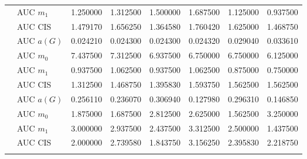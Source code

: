 \begin{table}[htbp]
\begin{tabular}{llrrrrrr}
    & AUC $m_1$ & 1.250000 & 1.312500 & 1.500000 & 1.687500 & 1.125000 & 0.937500 \\
    & AUC CIS & 1.479170 & 1.656250 & 1.364580 & 1.760420 & 1.625000 & 1.468750 \\
    \addlinespace
    \multirow{4}{*}{degree} & AUC $a(G)$ & 0.024210 & 0.024300 & 0.024300 & 0.024320 & 0.029040 & 0.033610 \\
    & AUC $m_0$ & 7.437500 & 7.312500 & 6.937500 & 6.750000 & 6.750000 & 6.125000 \\
    & AUC $m_1$ & 0.937500 & 1.062500 & 0.937500 & 1.062500 & 0.875000 & 0.750000 \\
    & AUC CIS & 1.312500 & 1.468750 & 1.395830 & 1.593750 & 1.562500 & 1.562500 \\
    \addlinespace
    \multirow{4}{*}{random} & AUC $a(G)$ & 0.256110 & 0.236070 & 0.306940 & 0.127980 & 0.296310 & 0.146850 \\
    & AUC $m_0$ & 1.875000 & 1.687500 & 2.812500 & 2.625000 & 1.562500 & 3.250000 \\
    & AUC $m_1$ & 3.000000 & 2.937500 & 2.437500 & 3.312500 & 2.500000 & 1.437500 \\
    & AUC CIS & 2.000000 & 2.739580 & 1.843750 & 3.156250 & 2.395830 & 2.218750 \\
    \addlinespace
    \bottomrule
  \end{tabular}
\end{table}

